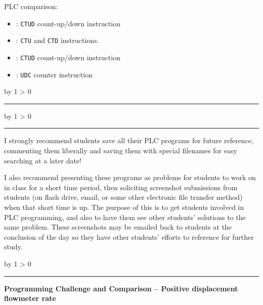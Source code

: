 \documentclass[12pt,a4paper]{article}
\def\oppgave{
            \advance\questnum by 1
            \ifnum \questnum > 0
                 \hrule
                 \vskip 3pt
                 \leftline{Oppgave \the\questnum}
                 \vskip 3pt \fi}
\def\svar{
           \advance\answnum by 1
           \ifnum \answnum > 0
                \hrule
                \vskip 3pt
                \leftline{Svar \the\answnum}
                \vskip 3pt \fi}
\def\notes{
           \advance\explnum by 1
           \ifnum \explnum > 0
                \hrule
                \vskip 3pt
                \leftline{Notes \the\explnum}
                \vskip 3pt \fi}
\begin{document}
\vfil 

\noindent
PLC comparison:

\begin{itemize}
\item{} : {\tt CTUD} count-up/down instruction
\vskip 5pt
\item{} : {\tt CTU} and {\tt CTD} instructions.
\vskip 5pt
\item{} : {\tt CTUD} count-up/down instruction
\vskip 5pt
\item{} : {\tt UDC} counter instruction
\end{itemize}

\eject
\vskip 10pt \filbreak 





\svar{} 


\vskip 10pt \filbreak 





\notes{} 

I strongly recommend students save all their PLC programs for future reference, commenting them liberally and saving them with special filenames for easy searching at a later date!

\vskip 10pt

I also recommend presenting these programs as problems for students to work on in class for a short time period, then soliciting screenshot submissions from students (on flash drive, email, or some other electronic file transfer method) when that short time is up.  The purpose of this is to get students involved in PLC programming, and also to have them see other students' solutions to the same problem.  These screenshots may be emailed back to students at the conclusion of the day so they have other students' efforts to reference for further study.



\vfil \eject 



\oppgave{} 

\noindent
{\bf Programming Challenge and Comparison -- Positive displacement flowmeter rate} 
\end{document}
